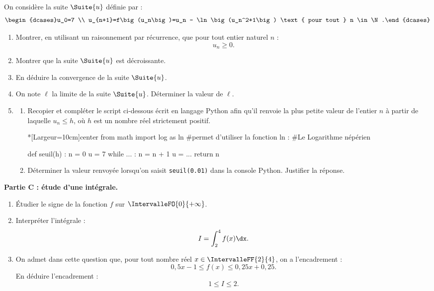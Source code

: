 On considère la suite $\Suite{u}$ définie par : \[ \begin{dcases}u_0=7 \\ u_{n+1}=f\big(u_n\big)=u_n - \ln\big(u_n^2+1\big) \text{ pour tout } n \in \N.\end{dcases} \]
%
\begin{enumerate}
	\item Montrer, en utilisant un raisonnement par récurrence, que pour tout entier naturel $n$ : \[ u_n \geqslant 0. \]
	\item Montrer que la suite $\Suite{u}$ est décroissante.
	\item En déduire la convergence de la suite $\Suite{u}$.
	\item On note $\ell$ la limite de la suite $\Suite{u}$. Déterminer la valeur de $\ell$.
	\item 
	\begin{enumerate}
		\item Recopier et compléter le script ci-dessous écrit en langage \textsf{Python} afin qu'il renvoie la plus petite valeur de l'entier $n$ à partir de laquelle $u_n \leqslant h$, où $h$ est un nombre réel strictement positif.

\begin{CodePythonLstAlt}*[Largeur=10cm]{center}
from math import log as ln
#permet d'utiliser la fonction ln :
#Le Logarithme népérien

def seuil(h) :
	n = 0
	u = 7
	while ... :
		n = n + 1
		u = ...
	return n
\end{CodePythonLstAlt}
	
	\item Déterminer la valeur renvoyée lorsqu'on saisit \texttt{seuil(0.01)} dans la console \textsf{Python}. Justifier la réponse.
	\end{enumerate}
\end{enumerate}


\begin{Centrage}
	\textbf{Partie C : étude d'une intégrale.}
\end{Centrage}

\begin{enumerate}
	\item Étudier le signe de la fonction $f$ sur $\IntervalleFO{0}{+\infty}$.
	\item Interpréter l'intégrale : \[ I=\int_2^4 f(x)\dx. \]
	\item On admet dans cette question que, pour tout nombre réel $x \in \IntervalleFF{2}{4}$, on a l'encadrement : \[ 0,5x-1 \leqslant f(x) \leqslant 0,25x+0,25. \]
	En déduire l'encadrement : \[ 1 \leqslant I \leqslant 2. \]
\end{enumerate}